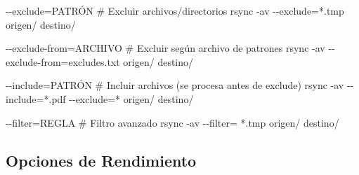 \documentclass[
  doc,
  floatsintext,
  longtable,
  a4paper,
  nolmodern,
  notxfonts,
  notimes,
  12pt,
  colorlinks=true,linkcolor=blue,citecolor=blue,urlcolor=blue]{apa7}
\newenvironment{Shaded}{\begin{snugshade}}{\end{snugshade}}
\newcommand{\AttributeTok}[1]{\textcolor[rgb]{0.40,0.45,0.13}{#1}}
\newcommand{\CommentTok}[1]{\textcolor[rgb]{0.37,0.37,0.37}{#1}}
\newcommand{\ExtensionTok}[1]{\textcolor[rgb]{0.00,0.23,0.31}{#1}}
\newcommand{\FunctionTok}[1]{\textcolor[rgb]{0.28,0.35,0.67}{#1}}
\newcommand{\NormalTok}[1]{\textcolor[rgb]{0.00,0.23,0.31}{#1}}
\newcommand{\OperatorTok}[1]{\textcolor[rgb]{0.37,0.37,0.37}{#1}}
\newcommand{\StringTok}[1]{\textcolor[rgb]{0.13,0.47,0.30}{#1}}
\begin{document}
\begin{Shaded}
\begin{Highlighting}[]
\ExtensionTok{{-}{-}exclude=PATRÓN}
    \CommentTok{\# Excluir archivos/directorios}
    \FunctionTok{rsync} \AttributeTok{{-}av} \AttributeTok{{-}{-}exclude}\OperatorTok{=}\StringTok{\textquotesingle{}*.tmp\textquotesingle{}}\NormalTok{ origen/ destino/}

\ExtensionTok{{-}{-}exclude{-}from=ARCHIVO}
    \CommentTok{\# Excluir según archivo de patrones}
    \FunctionTok{rsync} \AttributeTok{{-}av} \AttributeTok{{-}{-}exclude{-}from}\OperatorTok{=}\NormalTok{excludes.txt origen/ destino/}

\ExtensionTok{{-}{-}include=PATRÓN}
    \CommentTok{\# Incluir archivos (se procesa antes de exclude)}
    \FunctionTok{rsync} \AttributeTok{{-}av} \AttributeTok{{-}{-}include}\OperatorTok{=}\StringTok{\textquotesingle{}*.pdf\textquotesingle{}} \AttributeTok{{-}{-}exclude}\OperatorTok{=}\StringTok{\textquotesingle{}*\textquotesingle{}}\NormalTok{ origen/ destino/}

\ExtensionTok{{-}{-}filter=REGLA}
    \CommentTok{\# Filtro avanzado}
    \FunctionTok{rsync} \AttributeTok{{-}av} \AttributeTok{{-}{-}filter}\OperatorTok{=}\StringTok{\textquotesingle{}{-} *.tmp\textquotesingle{}}\NormalTok{ origen/ destino/}
\end{Highlighting}
\end{Shaded}

\subsection{Opciones de Rendimiento}\label{opciones-de-rendimiento}
\end{document}

